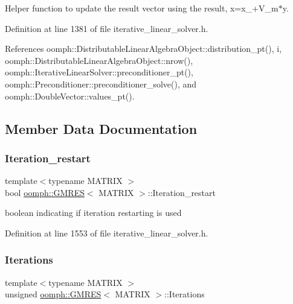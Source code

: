 Helper function to update the result vector using the result, x=x\+\_+\+V\+\_\+m$\ast$y. 



Definition at line 1381 of file iterative\+\_\+linear\+\_\+solver.\+h.



References oomph\+::\+Distributable\+Linear\+Algebra\+Object\+::distribution\+\_\+pt(), i, oomph\+::\+Distributable\+Linear\+Algebra\+Object\+::nrow(), oomph\+::\+Iterative\+Linear\+Solver\+::preconditioner\+\_\+pt(), oomph\+::\+Preconditioner\+::preconditioner\+\_\+solve(), and oomph\+::\+Double\+Vector\+::values\+\_\+pt().



\subsection{Member Data Documentation}
\mbox{\label{classoomph_1_1GMRES_af3eead7d42ad5190cbe6a5510ce352ea}} 
\subsubsection{\texorpdfstring{Iteration\+\_\+restart}{Iteration\_restart}}
{\footnotesize\ttfamily template$<$typename M\+A\+T\+R\+IX $>$ \\
bool \hyperlink{classoomph_1_1GMRES}{oomph\+::\+G\+M\+R\+ES}$<$ M\+A\+T\+R\+IX $>$\+::Iteration\+\_\+restart\hspace{0.3cm}{\ttfamily [private]}}



boolean indicating if iteration restarting is used 



Definition at line 1553 of file iterative\+\_\+linear\+\_\+solver.\+h.

\mbox{\label{classoomph_1_1GMRES_a6d261875800a43842579287fa1275ccb}} 
\subsubsection{\texorpdfstring{Iterations}{Iterations}}
{\footnotesize\ttfamily template$<$typename M\+A\+T\+R\+IX $>$ \\
unsigned \hyperlink{classoomph_1_1GMRES}{oomph\+::\+G\+M\+R\+ES}$<$ M\+A\+T\+R\+IX $>$\+::Iterations\hspace{0.3cm}{\ttfamily [private]}}




